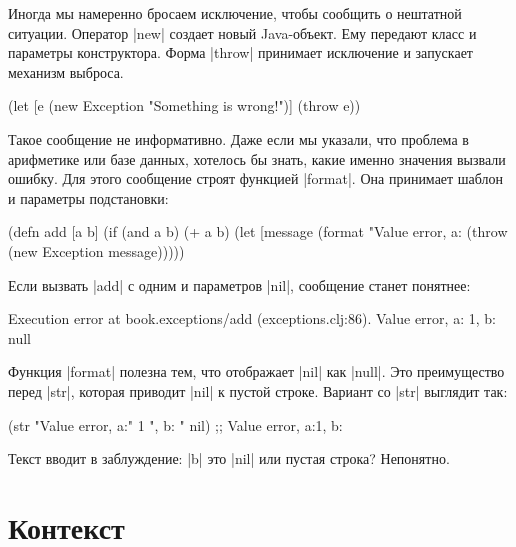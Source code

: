 Иногда мы намеренно бросаем исключение, чтобы сообщить о нештатной
ситуации. Оператор \spverb|new| создает новый Java-объект. Ему передают класс и
параметры конструктора. Форма \spverb|throw| принимает исключение и запускает
механизм выброса.

\begin{english}
  \begin{clojure}
(let [e (new Exception "Something is wrong!")]
  (throw e))
  \end{clojure}
\end{english}

Такое сообщение не информативно. Даже если мы указали, что проблема в арифметике
или базе данных, хотелось бы знать, какие именно значения вызвали ошибку. Для
этого сообщение строят функцией \spverb|format|. Она принимает шаблон и
параметры подстановки:

\begin{english}
  \begin{clojure}
(defn add [a b]
  (if (and a b)
    (+ a b)
    (let [message (format "Value error, a: %
      (throw (new Exception message)))))
  \end{clojure}
\end{english}

\noindent
Если вызвать \spverb|add| с одним и параметров \spverb|nil|, сообщение станет
понятнее:

\begin{english}
  \begin{clojure}
Execution error at book.exceptions/add (exceptions.clj:86).
Value error, a: 1, b: null
  \end{clojure}
\end{english}

Функция \spverb|format| полезна тем, что отображает \spverb|nil| как
\spverb|null|. Это преимущество перед \spverb|str|, которая приводит
\spverb|nil| к пустой строке. Вариант со \spverb|str| выглядит так:

\begin{english}
  \begin{clojure}
(str "Value error, a:" 1 ", b: " nil)
;; Value error, a:1, b:
  \end{clojure}
\end{english}

\noindent
Текст вводит в заблуждение: \spverb|b| это \spverb|nil| или пустая строка?
Непонятно.

\section{Контекст}

